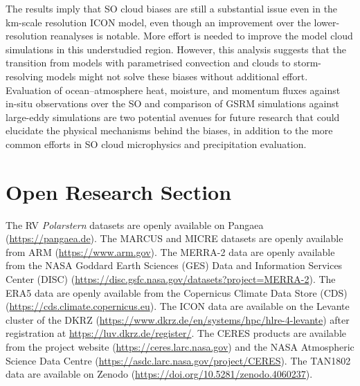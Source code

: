 \documentclass[draft]{agujournal2019}
\begin{document}
The results imply that SO cloud biases are still a substantial issue even in
the km-scale resolution ICON model, even though an improvement over the
lower-resolution reanalyses is notable. More effort is needed to improve the
model cloud simulations in this understudied region. However, this analysis
suggests that the transition from models with parametrised convection and
clouds to storm-resolving models might not solve these biases without
additional effort.  Evaluation of ocean--atmosphere heat, moisture, and
momentum fluxes against in-situ observations over the SO and comparison of GSRM
simulations against large-eddy simulations are two potential avenues for future
research that could elucidate the physical mechanisms behind the biases, in
addition to the more common efforts in SO cloud microphysics and precipitation
evaluation.

\section*{Open Research Section}

The RV \emph{Polarstern} datasets are openly available on Pangaea
(\url{https://pangaea.de}). The MARCUS and MICRE datasets are openly available
from ARM (\url{https://www.arm.gov}). The MERRA-2 data are openly available
from the NASA Goddard Earth Sciences (GES) Data and Information Services Center
(DISC) (\url{https://disc.gsfc.nasa.gov/datasets?project=MERRA-2}).  The ERA5
data are openly available from the Copernicus Climate Data Store (CDS)
(\url{https://cds.climate.copernicus.eu}). The ICON data are available on the
Levante cluster of the DKRZ
(\url{https://www.dkrz.de/en/systems/hpc/hlre-4-levante}) after registration at
\url{https://luv.dkrz.de/register/}. The CERES products are available from the
project website (\url{https://ceres.larc.nasa.gov}) and the NASA Atmospheric
Science Data Centre (\url{https://asdc.larc.nasa.gov/project/CERES}).  The
TAN1802 data are available on Zenodo
(\url{https://doi.org/10.5281/zenodo.4060237}).


\acknowledgments
\end{document}
